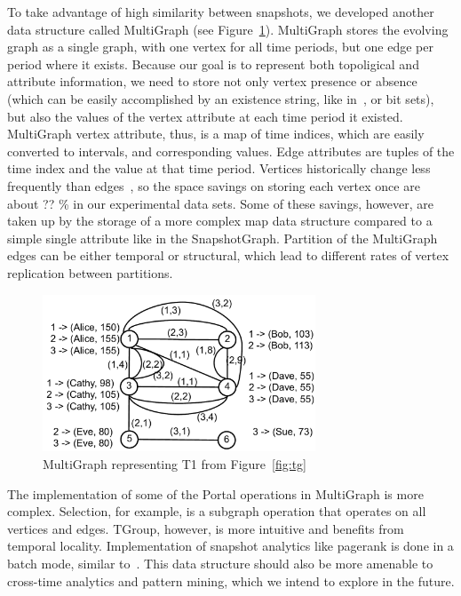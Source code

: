 To take advantage of high similarity between snapshots, we developed
another data structure called MultiGraph (see Figure~\ref{fig:mg}).
MultiGraph stores the evolving graph as a single graph, with one
vertex for all time periods, but one edge per period where it exists.
Because our goal is to represent both topoligical and attribute
information, we need to store not only vertex presence or absence
(which can be easily accomplished by an existence string, like
in~\cite{Kan2009}, or bit sets), but also the values of the vertex
attribute at each time period it existed.  MultiGraph vertex
attribute, thus, is a map of time indices, which are easily converted
to intervals, and corresponding values.  Edge attributes are tuples of
the time index and the value at that time period.  Vertices
historically change less frequently than edges~\cite{?}, so the space
savings on storing each vertex once are about ?? \% in our
experimental data sets.  Some of these savings, however, are taken up
by the storage of a more complex map data structure compared to a
simple single attribute like in the SnapshotGraph.  Partition of the
MultiGraph edges can be either temporal or structural, which lead to
different rates of vertex replication between partitions.

\begin{figure}[t!]
\includegraphics[width=3.2in]{figs/mg.pdf}
\caption{MultiGraph representing T1 from Figure~\ref{fig:tg}}
\label{fig:mg}
\end{figure}

The implementation of some of the Portal operations in MultiGraph is
more complex.  Selection, for example, is a subgraph operation that
operates on all vertices and edges.  TGroup, however, is more
intuitive and benefits from temporal locality.  Implementation of
snapshot analytics like pagerank is done in a batch mode, similar
to~\cite{DBLP:journals/tos/MiaoHLWYZPCC15}.  This data structure
should also be more amenable to cross-time analytics and pattern
mining, which we intend to explore in the future.

